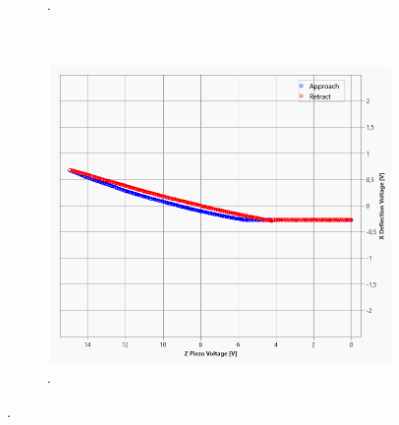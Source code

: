 \begin{figure}[H]
\begin{subfigure}[t]{0.3\textwidth}
	\caption{.}
	\label{abb:}
	\end{subfigure}
	\\
	\begin{subfigure}[t]{0.3\textwidth}
	\includegraphics[width=\textwidth]{AFM_auswertung/TiN_kurve.png}
	\caption{.}
	\label{abb:}
	\end{subfigure}
\caption{.}
\label{abb:auf3}
\end{figure}

